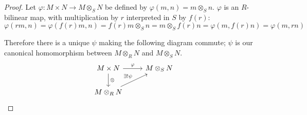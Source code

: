 \documentclass[12pt]{article}
\begin{document}


\begin{proof}
    Let $\varphi : M \times N \to M \otimes_{S} N$ be defined by $\varphi(m, n) = m \otimes_{S} n$.  $\varphi$ is an $R$-bilinear map, with multiplication by $r$ interpreted in $S$ by $f(r)$: \[  \varphi(rm, n) = \varphi(f(r)m, n) = f(r)m \otimes_{S}n = m \otimes_{S} f(r)n = \varphi(m, f(r)n) = \varphi(m, rn) \]

    Therefore there is a unique $\psi$ making the following diagram commute; $\psi$ is our canonical homomorphism between $M \otimes_{R} N$ and $M \otimes_{S} N$.
\[
    \begin{tikzcd}
        M \times N \arrow[r, "\varphi"] \arrow[d, "\otimes"] & M \otimes_{S} N \\
        M \otimes_{R} N \arrow[ur, "\exists ! \psi"]
    \end{tikzcd}
\]
\end{proof}
\end{document}
